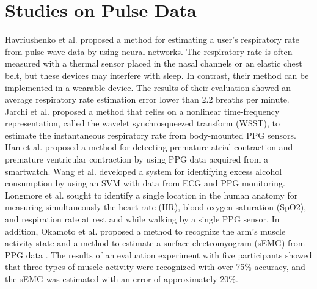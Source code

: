 \section{Studies on Pulse Data}
Havriushenko et al. \cite{respiratory_rate_estimation1} proposed a method for estimating a user's respiratory rate from pulse wave data by using neural networks. The respiratory rate is often measured with a thermal sensor placed in the nasal channels or an elastic chest belt, but these devices may interfere with sleep. In contrast, their method can be implemented in a wearable device. The results of their evaluation showed an average respiratory rate estimation error lower than 2.2 breaths per minute. Jarchi et al. \cite{respiratory_rate_estimation2} proposed a method that relies on a nonlinear time-frequency representation, called the wavelet synchrosqueezed transform (WSST), to estimate the instantaneous respiratory rate from body-mounted PPG sensors. Han et al. \cite{arrhythmia_detection} proposed a method for detecting premature atrial contraction and premature ventricular contraction by using PPG data acquired from a smartwatch. Wang et al. \cite{alcohol_detection} developed a system for identifying excess alcohol consumption by using an SVM with data from ECG and PPG monitoring. Longmore et al. \cite{ppg_location} sought to identify a single location in the human anatomy for measuring simultaneously the heart rate (HR), blood oxygen saturation (SpO2), and respiration rate at rest and while walking by a single PPG sensor. In addition, Okamoto et al. proposed a method to recognize the arm's muscle activity state and a method to estimate a surface electromyogram (sEMG) from PPG data \cite{semg_okamoto}. The results of an evaluation experiment with five participants showed that three types of muscle activity were recognized with over 75\% accuracy, and the sEMG was estimated with an error of approximately 20\%.\par

